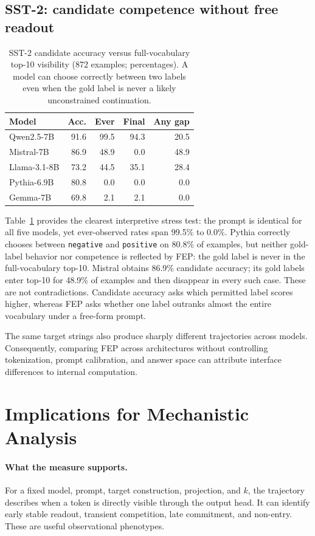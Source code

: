 \documentclass[11pt]{article}
\begin{document}
\subsection{SST-2: candidate competence without free readout}
\begin{table}[t]
\centering\small
\begin{tabular}{lrrrr}
\toprule
Model & Acc. & Ever & Final & Any gap \\
\midrule
Qwen2.5-7B & 91.6 & 99.5 & 94.3 & 20.5 \\
Mistral-7B & 86.9 & 48.9 & 0.0 & 48.9 \\
Llama-3.1-8B & 73.2 & 44.5 & 35.1 & 28.4 \\
Pythia-6.9B & 80.8 & 0.0 & 0.0 & 0.0 \\
Gemma-7B & 69.8 & 2.1 & 2.1 & 0.0 \\
\bottomrule
\end{tabular}
\caption{SST-2 candidate accuracy versus full-vocabulary top-10 visibility (872 examples; percentages). A model can choose correctly between two labels even when the gold label is never a likely unconstrained continuation.}
\label{tab:sst}
\end{table}

Table~\ref{tab:sst} provides the clearest interpretive stress test: the prompt is identical for all five models, yet ever-observed rates span 99.5\% to 0.0\%. Pythia correctly chooses between \texttt{negative} and \texttt{positive} on 80.8\% of examples, but neither gold-label behavior nor competence is reflected by FEP: the gold label is never in the full-vocabulary top-10. Mistral obtains 86.9\% candidate accuracy; its gold labels enter top-10 for 48.9\% of examples and then disappear in every such case. These are not contradictions. Candidate accuracy asks which permitted label scores higher, whereas FEP asks whether one label outranks almost the entire vocabulary under a free-form prompt.

The same target strings also produce sharply different trajectories across models. Consequently, comparing FEP across architectures without controlling tokenization, prompt calibration, and answer space can attribute interface differences to internal computation.

\section{Implications for Mechanistic Analysis}
\paragraph{What the measure supports.}
For a fixed model, prompt, target construction, projection, and $k$, the trajectory describes when a token is directly visible through the output head. It can identify early stable readout, transient competition, late commitment, and non-entry. These are useful observational phenotypes.
\end{document}
